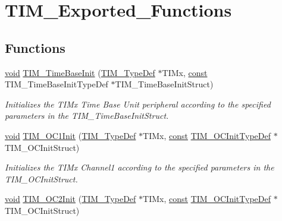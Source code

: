 \hypertarget{group___t_i_m___exported___functions}{\section{T\-I\-M\-\_\-\-Exported\-\_\-\-Functions}
\label{group___t_i_m___exported___functions}
}
\subsection*{Functions}
\begin{DoxyCompactItemize}
\item 
\hyperlink{group___n_a_m_e_ga18028b8badbf1ea7e704ccac3c488e82}{void} \hyperlink{group___t_i_m___exported___functions_ga80a4ab0dc73a14436df6bb9b60ae38af}{T\-I\-M\-\_\-\-Time\-Base\-Init} (\hyperlink{struct_t_i_m___type_def}{T\-I\-M\-\_\-\-Type\-Def} $\ast$T\-I\-Mx, \hyperlink{group___n_a_m_e_ga7ae6d0e43244213b34de2c2b9aa30da6}{const} T\-I\-M\-\_\-\-Time\-Base\-Init\-Type\-Def $\ast$T\-I\-M\-\_\-\-Time\-Base\-Init\-Struct)
\begin{DoxyCompactList}\small\item\em Initializes the T\-I\-Mx Time Base Unit peripheral according to the specified parameters in the T\-I\-M\-\_\-\-Time\-Base\-Init\-Struct. \end{DoxyCompactList}\item 
\hyperlink{group___n_a_m_e_ga18028b8badbf1ea7e704ccac3c488e82}{void} \hyperlink{group___t_i_m___exported___functions_gae1d1b0487894bbef135e28f842d08741}{T\-I\-M\-\_\-\-O\-C1\-Init} (\hyperlink{struct_t_i_m___type_def}{T\-I\-M\-\_\-\-Type\-Def} $\ast$T\-I\-Mx, \hyperlink{group___n_a_m_e_ga7ae6d0e43244213b34de2c2b9aa30da6}{const} \hyperlink{struct_t_i_m___o_c_init_type_def}{T\-I\-M\-\_\-\-O\-C\-Init\-Type\-Def} $\ast$T\-I\-M\-\_\-\-O\-C\-Init\-Struct)
\begin{DoxyCompactList}\small\item\em Initializes the T\-I\-Mx Channel1 according to the specified parameters in the T\-I\-M\-\_\-\-O\-C\-Init\-Struct. \end{DoxyCompactList}\item 
\hyperlink{group___n_a_m_e_ga18028b8badbf1ea7e704ccac3c488e82}{void} \hyperlink{group___t_i_m___exported___functions_ga7ffec43ecca5cbba9c1de4bd518e4f3b}{T\-I\-M\-\_\-\-O\-C2\-Init} (\hyperlink{struct_t_i_m___type_def}{T\-I\-M\-\_\-\-Type\-Def} $\ast$T\-I\-Mx, \hyperlink{group___n_a_m_e_ga7ae6d0e43244213b34de2c2b9aa30da6}{const} \hyperlink{struct_t_i_m___o_c_init_type_def}{T\-I\-M\-\_\-\-O\-C\-Init\-Type\-Def} $\ast$T\-I\-M\-\_\-\-O\-C\-Init\-Struct)

\end{DoxyCompactItemize}
